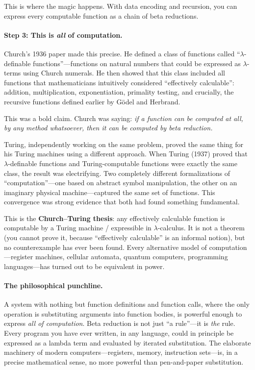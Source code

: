 \documentclass[11pt,a4paper]{article}
\theoremstyle{definition}
\newcommand{\lam}{\lambda}
\begin{document}
This is where the magic happens. With data encoding and recursion, you can
express every computable function as a chain of beta reductions.

\paragraph{Step 3: This is \emph{all} of computation.}
Church's 1936 paper made this precise. He defined a class of functions called
``$\lam$-definable functions''---functions on natural numbers that could be
expressed as $\lam$-terms using Church numerals. He then showed that this class
included all functions that mathematicians intuitively considered ``effectively
calculable'': addition, multiplication, exponentiation, primality testing,
and crucially, the recursive functions defined earlier by G\"odel and Herbrand.

This was a bold claim. Church was saying: \emph{if a function can be computed
at all, by any method whatsoever, then it can be computed by beta reduction.}

Turing, independently working on the same problem, proved the same thing for
his Turing machines using a different approach. When Turing (1937) proved that $\lam$-definable functions and Turing-computable functions
were exactly the same class, the result was electrifying. Two completely
different formalizations of ``computation''---one based on abstract
symbol manipulation, the other on an imaginary physical machine---captured
the same set of functions. This convergence was strong evidence that both
had found something fundamental.

This is the \textbf{Church--Turing thesis}: any effectively calculable function
is computable by a Turing machine / expressible in $\lam$-calculus. It is not a
theorem (you cannot prove it, because ``effectively calculable'' is an informal
notion), but no counterexample has ever been found. Every alternative model of
computation---register machines, cellular automata, quantum computers,
programming languages---has turned out to be equivalent in power.

\paragraph{The philosophical punchline.}
A system with nothing but function definitions and function calls, where the
only operation is substituting arguments into function bodies, is powerful
enough to express \emph{all of computation}. Beta reduction is not just
``a rule''---it is \emph{the} rule. Every program you have ever written,
in any language, could in principle be expressed as a lambda term and
evaluated by iterated substitution. The elaborate machinery of modern
computers---registers, memory, instruction sets---is, in a precise
mathematical sense, no more powerful than pen-and-paper substitution.
\end{document}
